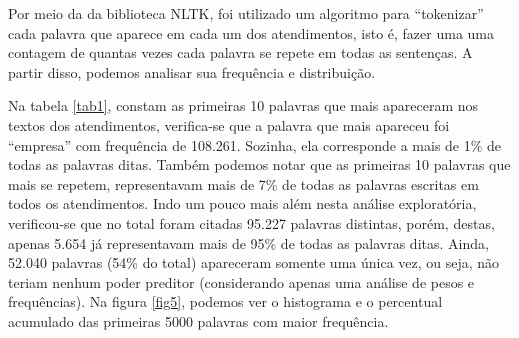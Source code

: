 \documentclass[twocolumn]{rbef}
\newcommand{\1}{\mathbbm{1}}
\begin{document}
\newline\linebreak Por meio da da biblioteca NLTK, foi utilizado um algoritmo para “tokenizar” cada palavra que aparece em cada um dos atendimentos, isto é, fazer uma uma contagem de quantas vezes cada palavra se repete em todas as sentenças. A partir disso, podemos analisar sua frequência e distribuição.
\begin{table}[!htb]
\caption{Frequência das primeiras 10 palavras}
\label{tab1}
\end{table}
\newline\linebreak Na tabela \ref{tab1}, constam as primeiras 10 palavras que mais apareceram nos textos dos atendimentos, verifica-se que a palavra que mais apareceu foi “empresa” com frequência de 108.261. Sozinha, ela corresponde a mais de 1\% de todas as palavras ditas. Também podemos notar que as primeiras 10 palavras que mais se repetem, representavam mais de 7\% de todas as palavras escritas em todos os atendimentos. Indo um pouco mais além nesta análise exploratória, verificou-se que no total foram citadas 95.227 palavras distintas, porém, destas, apenas 5.654 já representavam mais de 95\% de todas as palavras ditas. Ainda, 52.040 palavras (54\% do total) apareceram somente uma única vez, ou seja, não teriam nenhum poder preditor (considerando apenas uma análise de pesos e frequências). Na figura \ref{fig5}, podemos ver o histograma e o percentual acumulado das primeiras 5000 palavras com maior frequência.
\end{document}
